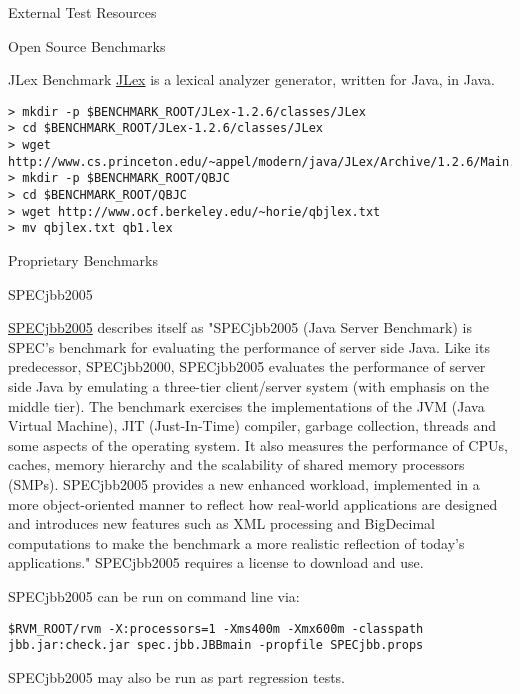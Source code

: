 \begin{section}{External Test Resources}
\begin{subsection}{Open Source Benchmarks}
\begin{subsubsection}{JLex Benchmark}
\href{http://www.cs.princeton.edu/~appel/modern/java/JLex/}{JLex} is a lexical analyzer generator, written for Java, in Java.

\begin{lstlisting}[breaklines=true, breakatwhitespace=false]
> mkdir -p $BENCHMARK_ROOT/JLex-1.2.6/classes/JLex
> cd $BENCHMARK_ROOT/JLex-1.2.6/classes/JLex
> wget http://www.cs.princeton.edu/~appel/modern/java/JLex/Archive/1.2.6/Main.java
> mkdir -p $BENCHMARK_ROOT/QBJC
> cd $BENCHMARK_ROOT/QBJC
> wget http://www.ocf.berkeley.edu/~horie/qbjlex.txt
> mv qbjlex.txt qb1.lex
\end{lstlisting}

\end{subsubsection}

\end{subsection}

\begin{subsection}{Proprietary Benchmarks}

\begin{subsubsection}{SPECjbb2005}

\href{http://www.spec.org/jbb2005/}{SPECjbb2005} describes itself as "SPECjbb2005 (Java Server Benchmark) is SPEC's benchmark for evaluating the performance of server side Java. Like its predecessor, SPECjbb2000, SPECjbb2005 evaluates the performance of server side Java by emulating a three-tier client/server system (with emphasis on the middle tier). The benchmark exercises the implementations of the JVM (Java Virtual Machine), JIT (Just-In-Time) compiler, garbage collection, threads and some aspects of the operating system. It also measures the performance of CPUs, caches, memory hierarchy and the scalability of shared memory processors (SMPs). SPECjbb2005 provides a new enhanced workload, implemented in a more object-oriented manner to reflect how real-world applications are designed and introduces new features such as XML processing and BigDecimal computations to make the benchmark a more realistic reflection of today's applications." SPECjbb2005 requires a license to download and use.

SPECjbb2005 can be run on command line via:

\begin{lstlisting}[breaklines=true, breakatwhitespace=false]
$RVM_ROOT/rvm -X:processors=1 -Xms400m -Xmx600m -classpath jbb.jar:check.jar spec.jbb.JBBmain -propfile SPECjbb.props
\end{lstlisting}

SPECjbb2005 may also be run as part regression tests.


\end{subsubsection}
\end{subsection}
\end{section}
